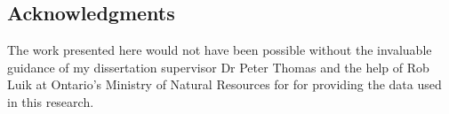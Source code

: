 \begin{spacing}{1.5}
\phantom
\phantom
\phantom
\phantom
\section*{Acknowledgments}
\phantom
\phantom
The work presented here would not have been possible without the invaluable guidance of my dissertation supervisor Dr Peter Thomas and the help of Rob Luik at Ontario's Ministry of Natural Resources for for providing the data used in this research.




\end{spacing}
\clearpage
